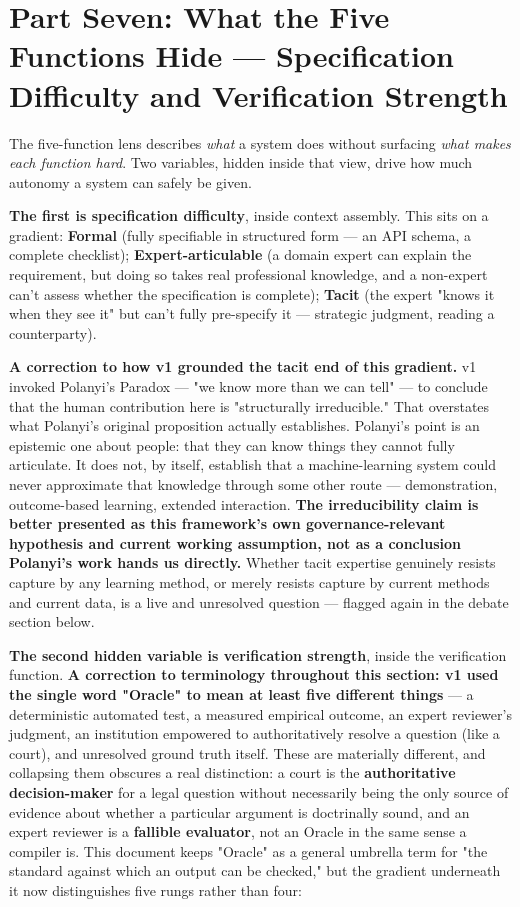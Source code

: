 \section{Part Seven: What the Five Functions Hide --- Specification Difficulty and Verification Strength}

The five-function lens describes \emph{what} a system does without surfacing \emph{what makes each function hard}. Two variables, hidden inside that view, drive how much autonomy a system can safely be given.

\textbf{The first is specification difficulty}, inside context assembly. This sits on a gradient: \textbf{Formal} (fully specifiable in structured form --- an API schema, a complete checklist); \textbf{Expert-articulable} (a domain expert can explain the requirement, but doing so takes real professional knowledge, and a non-expert can't assess whether the specification is complete); \textbf{Tacit} (the expert "knows it when they see it" but can't fully pre-specify it --- strategic judgment, reading a counterparty).

\textbf{A correction to how v1 grounded the tacit end of this gradient.} v1 invoked Polanyi's Paradox --- "we know more than we can tell" --- to conclude that the human contribution here is "structurally irreducible." That overstates what Polanyi's original proposition actually establishes. Polanyi's point is an epistemic one about people: that they can know things they cannot fully articulate. It does not, by itself, establish that a machine-learning system could never approximate that knowledge through some other route --- demonstration, outcome-based learning, extended interaction. \textbf{The irreducibility claim is better presented as this framework's own governance-relevant hypothesis and current working assumption, not as a conclusion Polanyi's work hands us directly.} Whether tacit expertise genuinely resists capture by any learning method, or merely resists capture by current methods and current data, is a live and unresolved question --- flagged again in the debate section below.

\textbf{The second hidden variable is verification strength}, inside the verification function. \textbf{A correction to terminology throughout this section: v1 used the single word "Oracle" to mean at least five different things} --- a deterministic automated test, a measured empirical outcome, an expert reviewer's judgment, an institution empowered to authoritatively resolve a question (like a court), and unresolved ground truth itself. These are materially different, and collapsing them obscures a real distinction: a court is the \textbf{authoritative decision-maker} for a legal question without necessarily being the only source of evidence about whether a particular argument is doctrinally sound, and an expert reviewer is a \textbf{fallible evaluator}, not an Oracle in the same sense a compiler is. This document keeps "Oracle" as a general umbrella term for "the standard against which an output can be checked," but the gradient underneath it now distinguishes five rungs rather than four:

